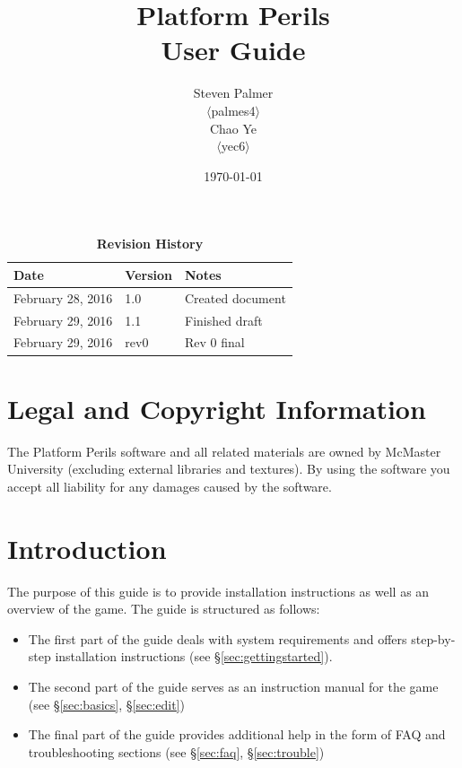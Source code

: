 \documentclass[12pt, titlepage]{article}
\begin{document}
\title{\bf Platform Perils\\[\baselineskip]\Large User Guide}
\author{Steven Palmer\\$\langle$palmes4$\rangle$\\Chao Ye\\$\langle$yec6$\rangle$}
\date{\today}
	
\maketitle

\tableofcontents
\listoftables
\listoffigures


\begin{table}[b]
\caption*{\bf Revision History}
\begin{tabularx}{\textwidth}{p{3.5cm}p{2cm}X}
\toprule {\bf Date} & {\bf Version} & {\bf Notes}\\
\midrule
February 28, 2016 & 1.0 & Created document\\
February 29, 2016 & 1.1 & Finished draft\\
February 29, 2016 & rev0 & Rev 0 final\\
\bottomrule
\end{tabularx}
\end{table}

\newpage


\section{Legal and Copyright Information}
The Platform Perils software and all related materials are owned by McMaster University (excluding external libraries and textures).  By using the software you accept all liability for any damages caused by the software.

\section{Introduction}
The purpose of this guide is to provide installation instructions as well as an overview of the game.  The guide is structured as follows:

\begin{itemize}
  \item The first part of the guide deals with system requirements and offers step-by-step installation instructions (see \hyperref[sec:gettingstarted]{\S\ref*{sec:gettingstarted}}).
  \item The second part of the guide serves as an instruction manual for the game (see \hyperref[sec:basics]{\S\ref*{sec:basics}}, \hyperref[sec:edit]{\S\ref*{sec:edit}})
  \item The final part of the guide provides additional help in the form of FAQ and troubleshooting sections (see \hyperref[sec:faq]{\S\ref*{sec:faq}}, \hyperref[sec:trouble]{\S\ref*{sec:trouble}})
\end{itemize}
\end{document}
